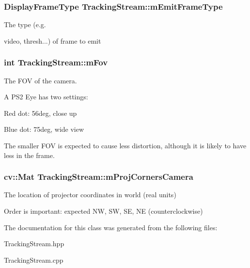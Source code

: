 \subsubsection[{\texorpdfstring{m\+Emit\+Frame\+Type}{mEmitFrameType}}]{\setlength{\rightskip}{0pt plus 5cm}Display\+Frame\+Type Tracking\+Stream\+::m\+Emit\+Frame\+Type\hspace{0.3cm}{\ttfamily [private]}}\hypertarget{classTrackingStream_ac9116756f01fbf7939da2f898d943dca}{}\label{classTrackingStream_ac9116756f01fbf7939da2f898d943dca}


The type (e.\+g. 

video, thresh...) of frame to emit 
\subsubsection[{\texorpdfstring{m\+Fov}{mFov}}]{\setlength{\rightskip}{0pt plus 5cm}int Tracking\+Stream\+::m\+Fov\hspace{0.3cm}{\ttfamily [private]}}\hypertarget{classTrackingStream_a34d7229ae0abe3f2f2d41e7e1ba6db7f}{}\label{classTrackingStream_a34d7229ae0abe3f2f2d41e7e1ba6db7f}


The F\+OV of the camera. 

A P\+S2 Eye has two settings\+:
\begin{DoxyItemize}
\item Red dot\+: 56deg, close up
\item Blue dot\+: 75deg, wide view
\end{DoxyItemize}

The smaller F\+OV is expected to cause less distortion, although it is likely to have less in the frame. 
\subsubsection[{\texorpdfstring{m\+Proj\+Corners\+Camera}{mProjCornersCamera}}]{\setlength{\rightskip}{0pt plus 5cm}cv\+::\+Mat Tracking\+Stream\+::m\+Proj\+Corners\+Camera\hspace{0.3cm}{\ttfamily [private]}}\hypertarget{classTrackingStream_a7c4a1620f5b3ad8ee91cc40aa586c7bb}{}\label{classTrackingStream_a7c4a1620f5b3ad8ee91cc40aa586c7bb}


The location of projector coordinates in world (real units) 

Order is important\+: expected NW, SW, SE, NE (counterclockwise) 

The documentation for this class was generated from the following files\+:\begin{DoxyCompactItemize}
\item 
Tracking\+Stream.\+hpp\item 
Tracking\+Stream.\+cpp\end{DoxyCompactItemize}
